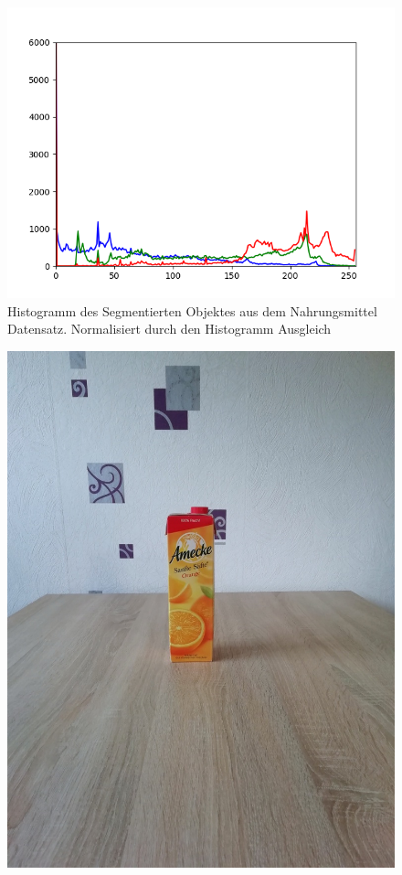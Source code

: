 \begin{appendices}
\begin{figure}[htb]
\begin{minipage}[c]{0.08\textwidth}
\end{minipage}
\hfill
\begin{minipage}[c]{0.3\textwidth}
\includegraphics[width=\textwidth]{Sources/Bild3_HA_histo.png}
\end{minipage}
\caption{Histogramm des Segmentierten Objektes aus dem Nahrungsmittel Datensatz. Normalisiert durch den Histogramm Ausgleich}
\label{img:evalHA}
\end{figure}
\newpage
\begin{figure}[htb]
\begin{minipage}[c]{0.2\textwidth}
\includegraphics[width=\textwidth]{Sources/Bild1_GW.jpg}

\end{minipage}
\end{figure}
\end{appendices}
